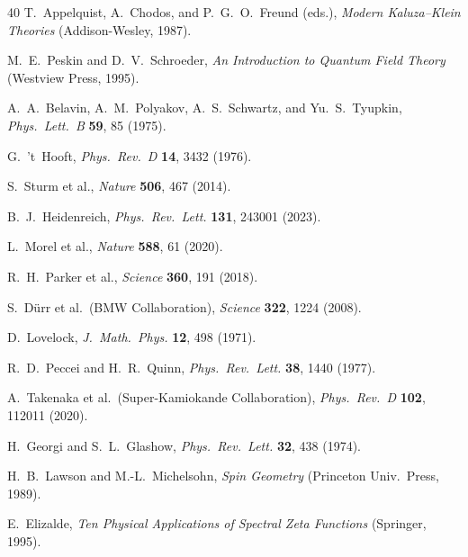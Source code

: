 \documentclass[11pt,a4paper]{article}
\theoremstyle{definition}
\theoremstyle{remark}
\begin{document}
\begin{thebibliography}{40}
  T.~Appelquist, A.~Chodos, and P.~G.~O.~Freund (eds.),
  \emph{Modern Kaluza--Klein Theories} (Addison-Wesley, 1987).

  M.~E.~Peskin and D.~V.~Schroeder,
  \emph{An Introduction to Quantum Field Theory}
  (Westview Press, 1995).

  A.~A.~Belavin, A.~M.~Polyakov, A.~S.~Schwartz, and Yu.~S.~Tyupkin,
  \emph{Phys.\ Lett.\ B} \textbf{59}, 85 (1975).

  G.~'t~Hooft, \emph{Phys.\ Rev.\ D} \textbf{14}, 3432 (1976).

  S.~Sturm et al., \emph{Nature} \textbf{506}, 467 (2014).

  B.~J.~Heidenreich, \emph{Phys.\ Rev.\ Lett.} \textbf{131}, 243001 (2023).

  L.~Morel et al., \emph{Nature} \textbf{588}, 61 (2020).

  R.~H.~Parker et al., \emph{Science} \textbf{360}, 191 (2018).

  S.~D\"urr et al.\ (BMW Collaboration), \emph{Science} \textbf{322},
  1224 (2008).

  D.~Lovelock, \emph{J.\ Math.\ Phys.} \textbf{12}, 498 (1971).

  R.~D.~Peccei and H.~R.~Quinn, \emph{Phys.\ Rev.\ Lett.} \textbf{38},
  1440 (1977).

  A.~Takenaka et al.\ (Super-Kamiokande Collaboration),
  \emph{Phys.\ Rev.\ D} \textbf{102}, 112011 (2020).

  H.~Georgi and S.~L.~Glashow, \emph{Phys.\ Rev.\ Lett.} \textbf{32},
  438 (1974).

  H.~B.~Lawson and M.-L.~Michelsohn,
  \emph{Spin Geometry} (Princeton Univ.\ Press, 1989).

  E.~Elizalde, \emph{Ten Physical Applications of Spectral Zeta Functions}
  (Springer, 1995).


\end{thebibliography}
\end{document}
